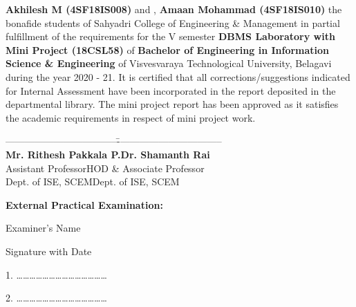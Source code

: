 \documentclass[12pt,a4paper]{report}
\begin{document}
\textbf{Akhilesh M (4SF18IS008)} and ,\textbf{ Amaan Mohammad (4SF18IS010)} the bonafide students of Sahyadri College of Engineering \& Management in partial fulfillment of the requirements for the V semester \textbf{DBMS Laboratory with Mini Project (18CSL58)} of \textbf{Bachelor of Engineering in Information Science \& Engineering} of Visvesvaraya Technological University, Belagavi during the year  2020 - 21. It is certified that all corrections/suggestions indicated for Internal Assessment have been incorporated in the report deposited in the departmental library. The mini project report has been approved as it satisfies the academic requirements in respect of mini project work.

\par
\vspace{0.75in}
\begin{tabbing}
-----------------------------------\hspace{2.5in}\=---------------------------------\\
\textbf{Mr. Rithesh Pakkala P.}\>\hspace{0.2in}\textbf{Dr. Shamanth Rai}\\
\hspace{0.30in}Assistant Professor\>\hspace{0.001in}HOD \& Associate Professor\\
\hspace{0.21in}Dept. of ISE, SCEM\>\hspace{0.2in}Dept. of ISE, SCEM\\

\end{tabbing}

\par
\vspace{0.25in}
\begin{center}
\large \textbf{External Practical Examination:}
\end{center}
\begin{flushleft}
\begin{normalsize}Examiner's Name \end{normalsize}
\hspace{7.5cm}
\begin{normalsize}Signature with Date\end{normalsize}
\end{flushleft}
\par
\vspace{0.05in}
\begin{flushleft}
1. \ldots\ldots\ldots\ldots\ldots\ldots \ldots \hspace{6.8cm}\ldots\ldots\ldots\ldots \ldots\ldots\ldots 
\par
\vspace{0.25in}	
2. \ldots\ldots\ldots\ldots\ldots\ldots \ldots \hspace{6.8cm}\ldots\ldots\ldots\ldots \ldots\ldots\ldots 
\end{flushleft}
\end{document}
